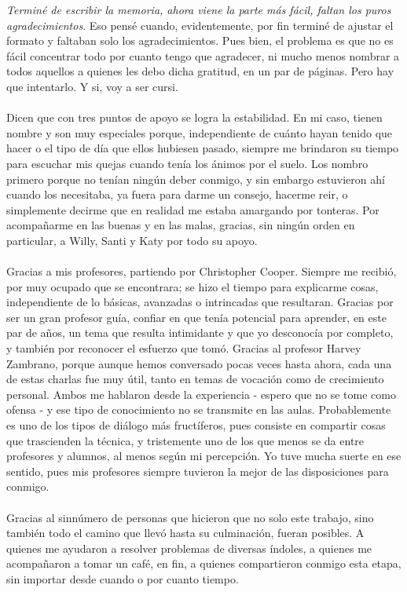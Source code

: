\textit{Terminé de escribir la memoria, ahora viene la parte más fácil, faltan los puros agradecimientos}. Eso pensé cuando, evidentemente, por fin terminé de ajustar el formato y faltaban solo los agradecimientos. Pues bien, el problema es que no es fácil concentrar todo por cuanto tengo que agradecer, ni mucho menos nombrar a todos aquellos a quienes les debo dicha gratitud, en un par de páginas. Pero hay que intentarlo. Y si, voy a ser cursi.\\\\
Dicen que con tres puntos de apoyo se logra la estabilidad. En mi caso, tienen nombre y son muy especiales porque, independiente de cuánto hayan tenido que hacer o el tipo de día que ellos hubiesen pasado, siempre me brindaron su tiempo para escuchar mis quejas cuando tenía los ánimos por el suelo. Los nombro primero porque no tenían ningún deber conmigo, y sin embargo estuvieron ahí cuando los necesitaba, ya fuera para darme un consejo, hacerme reir, o simplemente decirme que en realidad me estaba amargando por tonteras. Por acompañarme en las buenas y en las malas, gracias, sin ningún orden en particular, a Willy, Santi y Katy por todo su apoyo.\\\\
Gracias a mis profesores, partiendo por Christopher Cooper. Siempre me recibió, por muy ocupado que se encontrara; se hizo el tiempo para explicarme cosas, independiente de lo básicas, avanzadas o intrincadas que resultaran. Gracias por ser un gran profesor guía, confiar en que tenía potencial para aprender, en este par de años, un tema que resulta intimidante y que yo desconocía por completo, y también por reconocer el esfuerzo que tomó. Gracias al profesor Harvey Zambrano, porque aunque hemos conversado pocas veces hasta ahora, cada una de estas charlas fue muy útil, tanto en temas de vocación como de crecimiento personal. Ambos me hablaron desde la experiencia - espero que no se tome como ofensa - y ese tipo de conocimiento no se transmite en las aulas. Probablemente es uno de los tipos de diálogo más fructíferos, pues consiste en compartir cosas que trascienden la técnica, y tristemente uno de los que menos se da entre profesores y alumnos, al menos según mi percepción. Yo tuve mucha suerte en ese sentido, pues mis profesores siempre tuvieron la mejor de las disposiciones para conmigo.\\\\
Gracias al sinnúmero de personas que hicieron que no solo este trabajo, sino también todo el camino que llevó hasta su culminación, fueran posibles. A quienes me ayudaron a resolver problemas de diversas índoles, a quienes me acompañaron a tomar un café, en fin, a quienes compartieron conmigo esta etapa, sin importar desde cuando o por cuanto tiempo.\\\\
